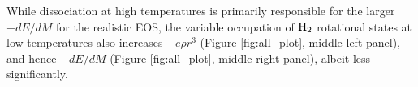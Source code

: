 \documentclass[apj]{emulateapj}
\newcommand{\delad}{\nabla_{\rm ad}}
\newcommand{\co}{_{\rm c}}
\begin{document}

While dissociation at high temperatures is primarily responsible for the larger $-dE/dM$ for the realistic EOS, the variable occupation of $\rm H_2$ rotational states at low temperatures also increases $-e \rho r^3$ (Figure \ref{fig:all_plot}, middle-left panel), and hence $-dE/dM$ (Figure \ref{fig:all_plot}, middle-right panel), albeit less significantly. %






\end{document}
